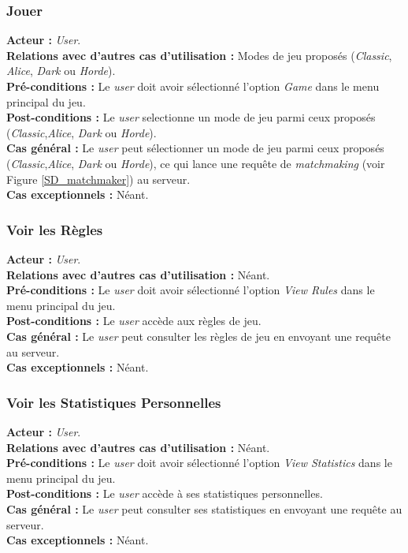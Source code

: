 \documentclass[10pt, a4paper]{article}
\begin{document}
\subsubsection{Jouer}
\textbf{Acteur :} \textit{User}.\\
\textbf{Relations avec d'autres cas d'utilisation :} Modes de jeu proposés (\textit{Classic}, \textit{Alice}, \textit{Dark} ou \textit{Horde}).\\
\textbf{Pré-conditions :} Le \textit{user} doit avoir sélectionné l'option \textit{Game} dans le menu principal du jeu.\\
\textbf{Post-conditions :} Le  \textit{user} selectionne un mode de jeu parmi ceux proposés (\textit{Classic},\textit{Alice}, \textit{Dark} ou \textit{Horde}).\\
\textbf{Cas général :} Le  \textit{user} peut sélectionner un mode de jeu parmi ceux proposés (\textit{Classic},\textit{Alice}, \textit{Dark} ou \textit{Horde}), ce qui lance une requête de \textit{matchmaking} (voir Figure \ref{SD_matchmaker}) au serveur.\\
\textbf{Cas exceptionnels :} Néant.



\subsubsection{Voir les Règles}
\textbf{Acteur :} \textit{User}.\\
\textbf{Relations avec d'autres cas d'utilisation :} Néant.\\
\textbf{Pré-conditions :} Le \textit{user} doit avoir sélectionné l'option \textit{View Rules} dans le menu principal du jeu.\\
\textbf{Post-conditions :} Le \textit{user} accède aux règles de jeu.\\
\textbf{Cas général :} Le \textit{user} peut consulter les règles de jeu en envoyant une requête au serveur.\\
\textbf{Cas exceptionnels :} Néant.

\subsubsection{Voir les Statistiques Personnelles}
\textbf{Acteur :} \textit{User}.\\
\textbf{Relations avec d'autres cas d'utilisation :} Néant.\\
\textbf{Pré-conditions :} Le \textit{user} doit avoir sélectionné l'option \textit{View Statistics} dans le menu principal du jeu.\\
\textbf{Post-conditions :} Le \textit{user} accède à ses statistiques personnelles.\\
\textbf{Cas général :} Le \textit{user} peut consulter ses statistiques en envoyant une requête au serveur.\\
\textbf{Cas exceptionnels :} Néant.
\end{document}
